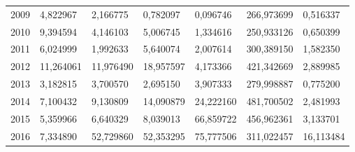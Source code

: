 \begin{table}
\begin{tabular}{p{1cm}p{2cm}p{2cm}p{2cm}p{2cm}p{2cm}p{2cm}}
 2009 &          4,822967 &             2,166775 &                             0,782097 &                            0,096746 &                  266,973699 &                            0,516337 \\
 2010 &          9,394594 &             4,146103 &                             5,006745 &                            1,334616 &                  250,933126 &                            0,650399 \\
 2011 &          6,024999 &             1,992633 &                             5,640074 &                            2,007614 &                  300,389150 &                            1,582350 \\
 2012 &         11,264061 &            11,976490 &                            18,957597 &                            4,173366 &                  421,342669 &                            2,889985 \\
 2013 &          3,182815 &             3,700570 &                             2,695150 &                            3,907333 &                  279,998887 &                            0,775200 \\
 2014 &          7,100432 &             9,130809 &                            14,090879 &                           24,222160 &                  481,700502 &                            2,481993 \\
 2015 &          5,359966 &             6,640329 &                             8,039013 &                           66,859722 &                  456,962361 &                            3,133701 \\
 2016 &          7,334890 &            52,729860 &                            52,353295 &                           75,777506 &                  311,022457 &                           16,113484 \\
\bottomrule
\end{tabular}
\end{table}
